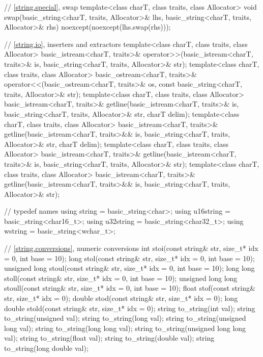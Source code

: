 \begin{codeblock}
{  // \ref{string.special}, swap
  template<class charT, class traits, class Allocator>
    void swap(basic_string<charT, traits, Allocator>& lhs,
              basic_string<charT, traits, Allocator>& rhs)
      noexcept(noexcept(lhs.swap(rhs)));

  // \ref{string.io}, inserters and extractors
  template<class charT, class traits, class Allocator>
    basic_istream<charT, traits>&
      operator>>(basic_istream<charT, traits>& is,
                 basic_string<charT, traits, Allocator>& str);
  template<class charT, class traits, class Allocator>
    basic_ostream<charT, traits>&
      operator<<(basic_ostream<charT, traits>& os,
                 const basic_string<charT, traits, Allocator>& str);
  template<class charT, class traits, class Allocator>
    basic_istream<charT, traits>&
      getline(basic_istream<charT, traits>& is,
              basic_string<charT, traits, Allocator>& str,
              charT delim);
  template<class charT, class traits, class Allocator>
    basic_istream<charT, traits>&
      getline(basic_istream<charT, traits>&& is,
              basic_string<charT, traits, Allocator>& str,
              charT delim);
  template<class charT, class traits, class Allocator>
    basic_istream<charT, traits>&
      getline(basic_istream<charT, traits>& is,
              basic_string<charT, traits, Allocator>& str);
  template<class charT, class traits, class Allocator>
    basic_istream<charT, traits>&
      getline(basic_istream<charT, traits>&& is,
              basic_string<charT, traits, Allocator>& str);

  //  typedef names
  using string    = basic_string<char>;
  using u16string = basic_string<char16_t>;
  using u32string = basic_string<char32_t>;
  using wstring   = basic_string<wchar_t>;

  // \ref{string.conversions}, numeric conversions
  int stoi(const string& str, size_t* idx = 0, int base = 10);
  long stol(const string& str, size_t* idx = 0, int base = 10);
  unsigned long stoul(const string& str, size_t* idx = 0, int base = 10);
  long long stoll(const string& str, size_t* idx = 0, int base = 10);
  unsigned long long stoull(const string& str, size_t* idx = 0, int base = 10);
  float stof(const string& str, size_t* idx = 0);
  double stod(const string& str, size_t* idx = 0);
  long double stold(const string& str, size_t* idx = 0);
  string to_string(int val);
  string to_string(unsigned val);
  string to_string(long val);
  string to_string(unsigned long val);
  string to_string(long long val);
  string to_string(unsigned long long val);
  string to_string(float val);
  string to_string(double val);
  string to_string(long double val);

}
\end{codeblock}

